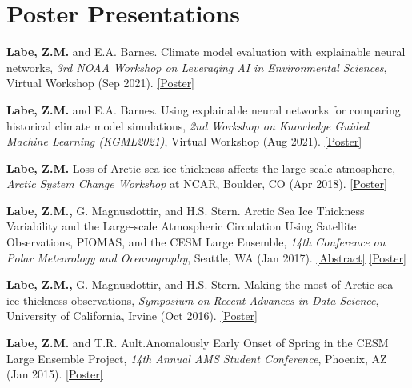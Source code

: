 \documentclass[margin,line,palatino,courier,10pt]{res}
\begin{document}
\begin{resume}
\begin{etaremune}[leftmargin=0in,topsep=0in,parsep=0in]
\end{etaremune}

\section{\sc \textcolor{Cerulean}{\large{\textbf{Poster Presentations}}}}
\begin{etaremune}[leftmargin=0in,topsep=0in,parsep=0in]
\item \textbf{Labe, Z.M.} and E.A. Barnes. Climate model evaluation with explainable neural networks, \textit{3rd NOAA Workshop on Leveraging AI in Environmental Sciences}, Virtual Workshop (Sep 2021). \href{https://sites.uci.edu/zlabe/files/2021/08/LabeBarnes_NOAA-AIES_2021_Poster.pdf}{[Poster]}
\item \textbf{Labe, Z.M.} and E.A. Barnes. Using explainable neural networks for comparing historical climate model simulations, \textit{2nd Workshop on Knowledge Guided Machine Learning (KGML2021)}, Virtual Workshop (Aug 2021). \href{https://sites.uci.edu/zlabe/files/2021/07/LabeBarnes_KGML2021_Poster_v2_Final.pdf}{[Poster]}
\item \textbf{Labe, Z.M.} Loss of Arctic sea ice thickness affects the large-scale atmosphere, \textit{Arctic System Change Workshop} at NCAR, Boulder, CO (Apr 2018). \href{https://sites.uci.edu/zlabe/files/2019/09/ZLabe_042018_BigIdeaPoster.pdf}{[Poster]}
\item \textbf{Labe, Z.M.,} G. Magnusdottir, and H.S. Stern. Arctic Sea Ice Thickness Variability and the Large-scale Atmospheric Circulation Using Satellite Observations, PIOMAS, and the CESM Large Ensemble, \textit{14th Conference on Polar Meteorology and Oceanography}, Seattle, WA (Jan 2017). \href{https://ams.confex.com/ams/97Annual/webprogram/Paper313445.html}{[Abstract]} \href{http://sites.uci.edu/zlabe/files/2017/01/ZLabeMagnusdottirStern_AMSposter_2017.pdf}{[Poster]}
\item \textbf{Labe, Z.M.,} G. Magnusdottir, and H.S. Stern. Making the most of Arctic sea ice thickness observations, \textit{Symposium on Recent Advances in Data Science}, University of California, Irvine (Oct 2016). \href{http://sites.uci.edu/zlabe/files/2016/10/ZLabeMagnusdottirStern_DSIposter_Oct16.pdf}{[Poster]}
\item \textbf{Labe, Z.M.} and T.R. Ault.\@ Anomalously Early Onset of Spring in the CESM Large Ensemble Project, \textit{14th Annual AMS Student Conference}, Phoenix, AZ (Jan 2015). \href{https://ams.confex.com/ams/95Annual/webprogram/Paper271063.html}{[Poster]}


\end{etaremune}
\end{resume}
\end{document}
